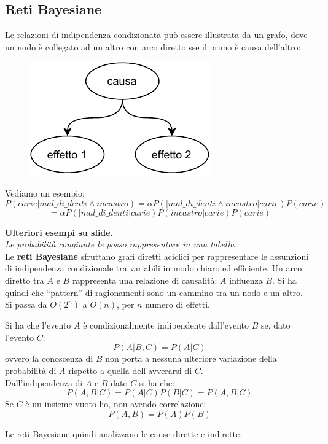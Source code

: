 \documentclass[a4paper,12pt, oneside]{book}
\begin{document}
\subsection{Reti Bayesiane}
Le relazioni di indipendenza condizionata può essere illustrata da un grafo,
dove un nodo è collegato ad un altro con arco diretto sse il primo è causa
dell'altro:
\begin{figure}[H]
  \centering
  \includegraphics[scale = 0.9]{img/b.pdf}
\end{figure}
\begin{esempio}
  Vediamo un esempio:
  \[P(carie|mal\_di\_denti\land incastro)=\alpha P(|mal\_di\_denti\land
    incastro|carie)P(carie)\]
  \[=\alpha P(|mal\_di\_denti|carie)P(incastro|carie)P(carie)\]
\end{esempio}
\textbf{Ulteriori esempi su slide}.\\
\textit{Le probabilità congiunte le posso rappresentare in una tabella.}\\
Le \textbf{reti Bayesiane} sfruttano grafi diretti aciclici per rappresentare le
assunzioni di indipendenza condizionale tra variabili in modo chiaro ed
efficiente. Un arco diretto tra $A$ e $B$ rappresenta una relazione di
causalità: $A$ influenza $B$. Si ha quindi che ``pattern'' di ragionamenti sono
un cammino tra un nodo e un altro.\\
Si passa da $O(2^n)$ a $O(n)$, per $n$ numero di effetti.
\begin{definizione}
  Si ha che l'evento $A$ è condizionalmente indipendente dall'evento $B$ se,
  dato l'evento $C$:
  \[P(A|B,C)=P(A|C)\]
  ovvero la conoscenza di $B$ non porta a nessuna ulteriore variazione della
  probabilità di $A$ rispetto a quella dell'avverarsi di $C$. \\
  Dall'indipendenza di $A$ e $B$ dato $C$ si ha che:
  \[P(A,B|C)=P(A|C)P(B|C)=P(A,B|C)\]
  Se $C$ è un insieme vuoto ho, non avendo correlazione:
  \[P(A,B)=P(A)P(B)\]
\end{definizione}
Le reti Bayesiane quindi analizzano le cause dirette e indirette.
\end{document}
